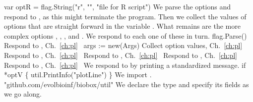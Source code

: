 var optR = flag.String("r", "", "file for R script")
\nwendcode{}\nwdocspar
We parse the options and respond to , as this might terminate
the program. Then we collect the values of options that are straight
forward in the variable . What remains are the more complex
options , , , and . We respond to each one
of these in turn.
\nwenddocs{}\endmoddef\nwstartdeflinemarkup{}\nwenddeflinemarkup
flag.Parse()
\LA{}Respond to , Ch.~\ref{ch:pl}~{\nwtagstyle{}}\RA{}
args := new(Args)
\LA{}Collect option values, Ch.~\ref{ch:pl}~{\nwtagstyle{}}\RA{}
\LA{}Respond to , Ch.~\ref{ch:pl}~{\nwtagstyle{}}\RA{}
\LA{}Respond to , Ch.~\ref{ch:pl}~{\nwtagstyle{}}\RA{}
\LA{}Respond to , Ch.~\ref{ch:pl}~{\nwtagstyle{}}\RA{}
\LA{}Respond to , Ch.~\ref{ch:pl}~{\nwtagstyle{}}\RA{}
\nwendcode{}\nwdocspar
We respond to  by printing a standardized message.
\nwenddocs{}\endmoddef\nwstartdeflinemarkup{}\nwenddeflinemarkup
if *optV \{
          util.PrintInfo("plotLine")
\}
\nwendcode{}\nwdocspar
We import .
\nwenddocs{}\plusendmoddef\nwstartdeflinemarkup{}\nwenddeflinemarkup
"github.com/evolbioinf/biobox/util"
\nwendcode{}\nwdocspar
We declare the type  and specify its fields as we go along.
\nwenddocs{}\endmoddef\nwstartdeflinemarkup{}\nwenddeflinemarkup
